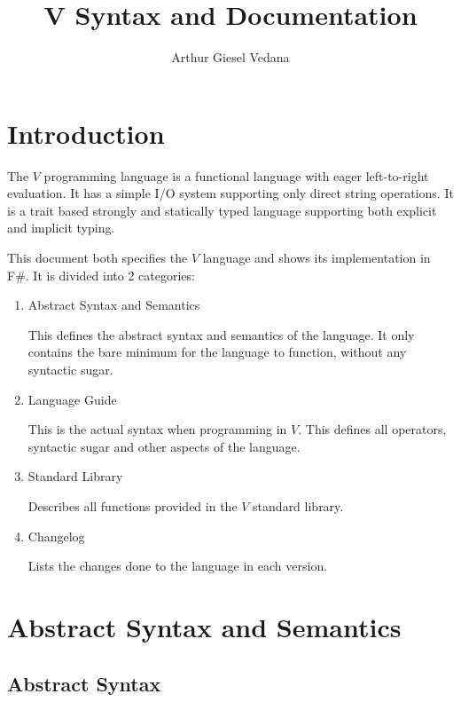 \documentclass{article}
\author{Arthur Giesel Vedana}
\title{V Syntax and Documentation}
\begin{document}
\maketitle
{}
\newpage

\tableofcontents
\newpage

\section*{Introduction}
The $V$ programming language is a functional language with eager left-to-right evaluation.
It has a simple I/O system supporting only direct string operations.
It is a trait based strongly and statically typed language supporting both explicit and implicit typing.


This document both specifies the $V$ language and shows its implementation in F\#.
It is divided into 2 categories:
\begin{enumerate}
    \item Abstract Syntax and Semantics

        This defines the abstract syntax and semantics of the language.
        It only contains the bare minimum for the language to function, without any syntactic sugar.
    \item Language Guide

        This is the actual syntax when programming in $V$.
        This defines all operators, syntactic sugar and other aspects of the language.

    \item Standard Library

        Describes all functions provided in the $V$ standard library.

    \item Changelog

         Lists the changes done to the language in each version.
\end{enumerate}

\newpage
{}
\section{Abstract Syntax and Semantics}

\subsection{Abstract Syntax}
\end{document}
